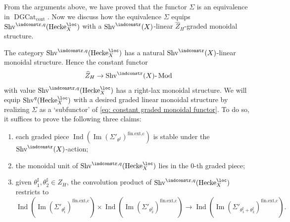 \documentclass[10pt]{amsart}
\newcommand{\sssec}{\subsubsection}
\theoremstyle{remark}
\newcommand{\wh}{\widehat}
\newcommand{\on}{\operatorname}
\newcommand{\DGcat}{\on{DGCat}_{\on{cont}}}
\newcommand{\lMod}{\text{-}\on{Mod}}
\newcommand{\Shv}{\on{Shv}}
\DeclareMathOperator{\Ind}{Ind}
\newcommand{\Hecke}{\on{Hecke}}
\begin{document}
\sssec{}\label{sssec: lift of Shv Hecke}
From the arguments above, we have proved that the functor $\Sigma$ is an equivalence in $\DGcat$. Now we discuss how the equivalence $\Sigma$ equips $\Shv^{\indconstr,q}(\Hecke^{\loc}_X)$ with a $\Shv^{\indconstr}(X)$-linear $\wh{Z}_H$-graded monoidal structure.
\medskip

The category $\Shv^{\indconstr,q}(\Hecke^{\loc}_X)$ has a natural $\Shv^{\indconstr}(X)$-linear monoidal structure. Hence the constant functor
\begin{equation}\label{eq: constant graded monoidal functor}
    \wh{Z}_H\rightarrow \Shv^{\indconstr}(X)\lMod
\end{equation}
with value $\Shv^{\indconstr,q}(\Hecke^{\loc}_X)$ has a right-lax monoidal structure. We will equip $\Shv^q(\Hecke^{\loc}_X)$ with a desired graded linear monoidal structure by realizing $\Sigma$ as a `subfunctor' of \eqref{eq: constant graded monoidal functor}. To do so, it suffices to prove the following three claims:
\begin{enumerate}
    \item each graded piece $\Ind(\on{Im}(\Sigma'_{\theta^{\sharp}})^{\on{fin.ext,c}})$ is stable under the $\Shv^{\indconstr}(X)$-action;
    \item the monoidal unit of $\Shv^{\indconstr,q}(\Hecke^{\loc}_X)$ lies in the $0$-th graded piece;
    \item given $\theta^{\sharp}_1,\theta^{\sharp}_2\in\wh{Z}_H$, the convolution product of $\Shv^{\indconstr,q}(\Hecke^{\loc}_X)$ restricts to
    \[\Ind(\on{Im}(\Sigma'_{\theta^{\sharp}_1})^{\on{fin.ext,c}})\times \Ind(\on{Im}(\Sigma'_{\theta^{\sharp}_2})^{\on{fin.ext,c}})\rightarrow \Ind(\on{Im}(\Sigma'_{\theta^{\sharp}_1+\theta^{\sharp}_2})^{\on{fin.ext,c}}).\]
\end{enumerate}
\end{document}

